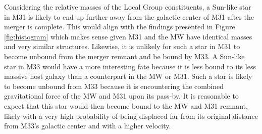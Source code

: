 \documentclass{aastex63}
\begin{document}
Considering the relative masses of the Local Group constituents, a Sun-like star in M31 is likely to end up further away from the galactic center of M31 after the merger is complete. This would align with the findings presented in Figure \ref{fig:histogram} which makes sense given M31 and the MW have identical masses and very similar structures. Likewise, it is unlikely for such a star in M31 to become unbound from the merger remnant and be bound by M33. A Sun-like star in M33 would have a more interesting fate because it is less bound to its less massive host galaxy than a counterpart in the MW or M31. Such a star is likely to become unbound from M33 because it is encountering the combined gravitational force of the MW and M31 upon its pass-by. It is reasonable to expect that this star would then become bound to the MW and M31 remnant, likely with a very high probability of being displaced far from its original distance from M33's galactic center and with a higher velocity.


{}

\end{document}
